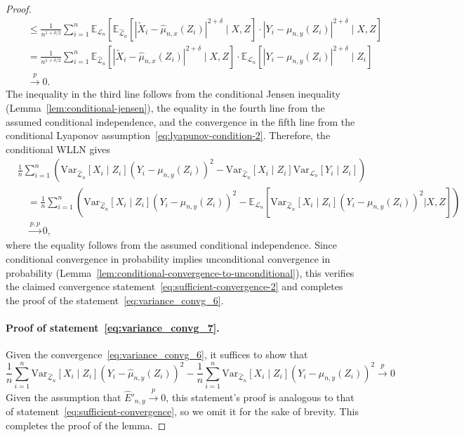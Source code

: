 \documentclass[12pt]{article}
\theoremstyle{definition}
\theoremstyle{remark}
\newcommand{\E}{\mathbb E}								%
\newcommand{\V}{\mathrm{Var}}							%
\newcommand{\convp}{\overset p \rightarrow}             %
\newcommand{\srx}{X}									%
\newcommand{\srz}{Z}									%
\newcommand{\srxk}{\widetilde X}						%
\newcommand{\sry}{Y}									%
\newcommand{\law}{\mathcal L}							%
\newcommand{\lawhat}{\widehat{\mathcal L}}				%
\newcommand{\convpp}{\overset {p,p} \longrightarrow}    %
\begin{document}
\begin{proof}
\begin{align*}
		&\quad\leq \frac{1}{n^{1+\delta/2}} \sum_{i = 1}^n \E_{\law_n}\left[\E_{\lawhat_n}[|\srxk_i-\widehat{\mu}_{n,x}(Z_i)|^{2+\delta} \mid \srx, \srz] \cdot |\sry_i-\mu_{n,y}(Z_i)|^{2+\delta} \mid \srx,\srz\right]\\
		&\quad= \frac{1}{n^{1+\delta/2}} \sum_{i = 1}^n \E_{\lawhat_n}[|\srxk_i-\widehat\mu_{n,x}(Z_i)|^{2+\delta}\mid \srx, \srz] \cdot \E_{\law_n}\left[|\sry_i-\mu_{n,y}(Z_i)|^{2+\delta} \mid Z_i\right]\\
		&\quad\convp 0. 
	\end{align*}
	The inequality in the third line follows from the conditional Jensen inequality (Lemma~\ref{lem:conditional-jensen}), the equality in the fourth line from the assumed conditional independence, and the convergence in the fifth line from the conditional Lyaponov assumption~\eqref{eq:lyapunov-condition-2}. Therefore, the conditional WLLN gives
	\begin{equation*}
	\begin{split}
	&\frac{1}{n} \sum_{i=1}^n \left(\V_{\lawhat_n}[\srx_i\mid \srz_i](\sry_i-\mu_{n,y}(\srz_i))^2- \V_{\lawhat_n}[\srx_i\mid \srz_i]\V_{\law_n}[\sry_i \mid \srz_i]\right) \\
	&\quad = \frac{1}{n} \sum_{i=1}^n \left(\V_{\lawhat_n}[\srx_i\mid \srz_i](\sry_i-\mu_{n,y}(\srz_i))^2- \E_{\law_n}[\V_{\lawhat_n}[\srx_i\mid \srz_i](\sry_i-\mu_{n,y}(\srz_i))^2 | \srx, \srz]\right) \\
	&\quad \convpp 0,
	\end{split}
	\end{equation*}
	where the equality follows from the assumed conditional independence. Since conditional convergence in probability implies unconditional convergence in probability (Lemma~\ref{lem:conditional-convergence-to-unconditional}), this verifies the claimed convergence statement~\eqref{eq:sufficient-convergence-2} and completes the proof of the statement~\eqref{eq:variance_convg_6}.

\paragraph{Proof of statement~\eqref{eq:variance_convg_7}.} 

Given the convergence~\eqref{eq:variance_convg_6}, it suffices to show that
\begin{equation}
\frac{1}{n}\sum_{i=1}^n \V_{\lawhat_n}[\srx_i\mid \srz_i](\sry_i-\widehat \mu_{n,y}(\srz_i))^2-\frac{1}{n}\sum_{i=1}^n \V_{\lawhat_n}[\srx_i\mid \srz_i](\sry_i-\mu_{n,y}(\srz_i))^2
\convp 0
\end{equation}
Given the assumption that $\widehat E'_{n,y} \convp 0$, this statement's proof is analogous to that of statement~\eqref{eq:sufficient-convergence}, so we omit it for the sake of brevity. This completes the proof of the lemma.
\end{proof}
\end{document}
